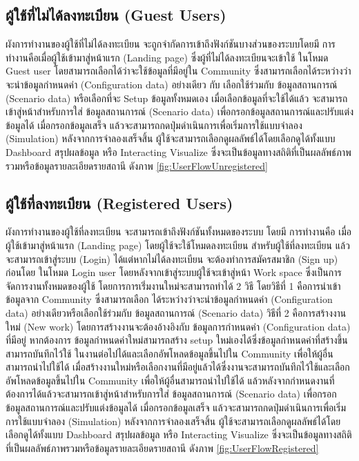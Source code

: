   \subsection{ผู้ใช้ที่ไม่ได้ลงทะเบียน (Guest Users)}
  \begin{mypara}
    \indent ผังการทำงานของผู้ใช้ที่ไม่ได้ลงทะเบียน จะถูกจำกัดการเข้าถึงฟังก์ชันบางส่วนของระบบโดยมี
    การทำงานคือเมื่อผู้ใช้เข้ามาสู่หน้าแรก (Landing page) ซึ่งผู้ที่ไม่ได้ลงทะเบียนจะเข้าใช้
    ในโหมด Guest user โดยสามารถเลือกได้ว่าจะใช้ข้อมูลที่มีอยู่ใน Community 
    ซึ่งสามารถเลือกได้ระหว่างว่าจะนำข้อมูลกำหนดค่า (Configuration data) อย่างเดียว กับ เลือกใช้ร่วมกับ
    ข้อมูลสถานการณ์ (Scenario data) หรือเลือกที่จะ Setup ข้อมูลทั้งหมดเอง เมื่อเลือกข้อมูลที่จะใช้ได้แล้ว
    จะสามารถ เข้าสู่หน้าสำหรับการใส่ ข้อมูลสถานการณ์ (Scenario data) เพื่อกรอกข้อมูลสถานการณ์และปรับแต่งข้อมูลได้ เมื่อกรอกข้อมูลเสร็จ
    แล้วจะสามารถกดปุ่มดำเนินการเพื่อเริ่มการใช้แบบจําลอง (Simulation) หลังจากการจำลองเสร็จสิ้น
    ผู้ใช้จะสามารถเลือกดูผลลัพธ์ได้โดยเลือกดูได้ทั้งแบบ Dashboard สรุปผลข้อมูล หรือ Interacting Visualize
    ซึ่งจะเป็นข้อมูลทางสถิติที่เป็นผลลัพธ์ภาพรวมหรือข้อมูลรายละเอียดรายสถานี ดังภาพ \ref{fig:UserFlowUnregistered}
  \end{mypara}

  \subsection{ผู้ใช้ที่ลงทะเบียน (Registered Users)}
  
  \begin{mypara}
    \indent ผังการทำงานของผู้ใช้ที่ลงทะเบียน จะสามารถเข้าถึงฟังก์ชันทั้งหมดของระบบ โดยมี
    การทำงานคือ เมื่อผู้ใช้เข้ามาสู่หน้าแรก (Landing page) โดยผู้ใช้จะใช้โหมดลงทะเบียน สำหรับผู้ใช้ที่ลงทะเบียน
    แล้วจะสามารถเข้าสู่ระบบ (Login) ได้แต่หากไม่ได้ลงทะเบียน จะต้องทำการสมัครสมาชิก (Sign up) ก่อนโดย
    ในโหมด Login user โดยหลังจากเข้าสู่ระบบผู้ใช้จะเข้าสู่หน้า Work space ซึ่งเป็นการจัดการงานทั้งหมดของผู้ใช้
    โดยการการเริ่่มงานใหม่จะสามารถทำได้ 2 วิธี โดยวิธีที่ 1 คือการนำเข้าข้อมูลจาก Community ซึ่งสามารถเลือก
    ได้ระหว่างว่าจะนำข้อมูลกำหนดค่า (Configuration data) อย่างเดียวหรือเลือกใช้ร่วมกับ
    ข้อมูลสถานการณ์ (Scenario data) วิธีที่ 2 คือการสร้างงานใหม่ (New work) 
    โดยการสร้างงานจะต้องอ้างอิงกับ ข้อมูลการกำหนดค่า (Configuration data) ที่มีอยู่ หากต้องการ
    ข้อมูลกำหนดค่าใหม่สามารถสร้าง setup ใหม่เองได้ซึ่งข้อมูลกำหนดค่าที่สร้างขึ้นสามารถบันทึกไว้ใช้
    ในงานต่อไปได้และเลือกอัพโหลดข้อมูลขึ้นไปใน Community เพื่อให้ผู้อื่นสามารถนำไปใช้ได้
    เมื่อสร้างงานใหม่หรือเลือกงานที่มีอยู่แล้วได้ซึ่งงานจะสามารถบันทึกไว้ใช้และเลือกอัพโหลดข้อมูลขึ้นไปใน Community เพื่อให้ผู้อื่นสามารถนำไปใช้ได้
    แล้วหลังจากกำหนดงานที่ต้องการได้แล้วจะสามารถเข้าสู่หน้าสำหรับการใส่ 
    ข้อมูลสถานการณ์ (Scenario data) 
    เพื่อกรอกข้อมูลสถานการณ์และปรับแต่งข้อมูลได้ เมื่อกรอกข้อมูลเสร็จ
    แล้วจะสามารถกดปุ่มดำเนินการเพื่อเริ่มการใช้แบบจําลอง (Simulation) หลังจากการจำลองเสร็จสิ้น
    ผู้ใช้จะสามารถเลือกดูผลลัพธ์ได้โดยเลือกดูได้ทั้งแบบ Dashboard สรุปผลข้อมูล หรือ Interacting Visualize
    ซึ่งจะเป็นข้อมูลทางสถิติที่เป็นผลลัพธ์ภาพรวมหรือข้อมูลรายละเอียดรายสถานี 
    ดังภาพ \ref{fig:UserFlowRegistered} 
  \end{mypara}

